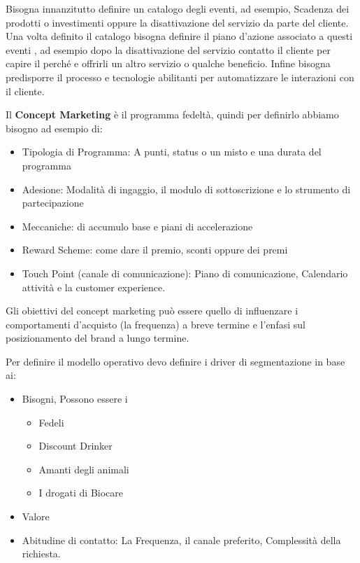 \documentclass[11pt]{article}
\begin{document}
Bisogna innanzitutto definire un catalogo degli eventi, ad esempio, Scadenza dei prodotti o investimenti oppure la disattivazione del servizio da parte del cliente. 
Una volta definito il catalogo bisogna definire il piano d'azione associato a questi eventi , ad esempio dopo la disattivazione del servizio contatto il cliente per capire il perché e offrirli un altro servizio o qualche beneficio. 
Infine bisogna predisporre il processo e tecnologie abilitanti per automatizzare le interazioni con il cliente.

Il \textbf{Concept Marketing} è il programma fedeltà, quindi per definirlo abbiamo bisogno ad esempio di:
\begin{itemize}[noitemsep,topsep=0ex]
	\item Tipologia di Programma: A punti, status o un misto e una durata del programma
	\item Adesione: Modalità di ingaggio, il modulo di sottoscrizione e lo strumento di partecipazione
	\item Meccaniche: di accumulo base e piani di accelerazione
	\item Reward Scheme: come dare il premio, sconti oppure dei premi
	\item Touch Point (canale di comunicazione): Piano di comunicazione, Calendario attività e la customer experience.
\end{itemize}
Gli obiettivi del concept marketing può essere quello di influenzare i comportamenti d'acquisto (la frequenza) a breve termine e l'enfasi sul posizionamento del brand a lungo termine.

Per definire il modello operativo devo definire i driver di segmentazione in base ai:
\begin{itemize}[noitemsep,topsep=0ex]
	\item Bisogni, Possono essere i
	\begin{itemize}[noitemsep,topsep=0ex]
		\item Fedeli
		\item Discount Drinker
		\item Amanti degli animali
		\item I drogati di Biocare
	\end{itemize}
	\item Valore
	\item Abitudine di contatto: La Frequenza, il canale preferito, Complessità della richiesta.
\end{itemize}
\end{document}
